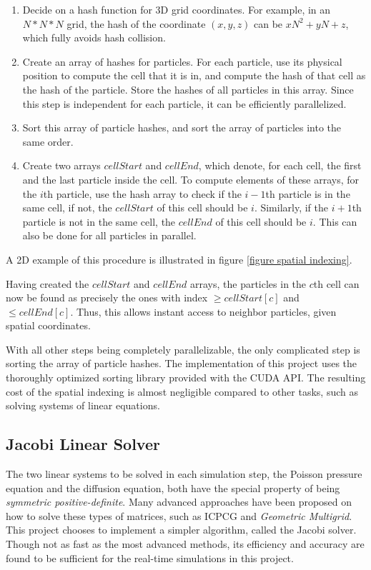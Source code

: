 \begin{enumerate}
    \item Decide on a hash function for 3D grid coordinates. For example, in an $N*N*N$ grid, the hash of the coordinate $(x,y,z)$ can be $xN^2+yN+z$, which fully avoids hash collision.
    
    \item Create an array of hashes for particles. For each particle, use its physical position to compute the cell that it is in, and compute the hash of that cell as the hash of the particle. Store the hashes of all particles in this array. Since this step is independent for each particle, it can be efficiently parallelized.
    
    \item Sort this array of particle hashes, and sort the array of particles into the same order. 
    
    \item Create two arrays $cellStart$ and $cellEnd$, which denote, for each cell, the first and the last particle inside the cell. To compute elements of these arrays, for the $i$th particle, use the hash array to check if the $i-1$th particle is in the same cell, if not, the $cellStart$ of this cell should be $i$. Similarly, if the $i+1$th particle is not in the same cell, the $cellEnd$ of this cell should be $i$. This can also be done for all particles in parallel.
    
\end{enumerate}
A 2D example of this procedure is illustrated in figure \ref{figure spatial indexing}. 

Having created the $cellStart$ and $cellEnd$ arrays, the particles in the $c$th cell can now be found as precisely the ones with index $\geq cellStart[c]$ and $\leq cellEnd[c]$. Thus, this allows instant access to neighbor particles, given spatial coordinates.

With all other steps being completely parallelizable, the only complicated step is sorting the array of particle hashes. The implementation of this project uses the thoroughly optimized sorting library provided with the CUDA API. The resulting cost of the spatial indexing is almost negligible compared to other tasks, such as solving systems of linear equations.



\subsection{Jacobi Linear Solver}
The two linear systems to be solved in each simulation step, the Poisson pressure equation and the diffusion equation, both have the special property of being \textit{symmetric positive-definite}. Many advanced approaches have been proposed on how to solve these types of matrices, such as ICPCG \cite{bridson2015fluid} and \textit{Geometric Multigrid}\cite{chentanez2011real}. This project chooses to implement a simpler algorithm, called the Jacobi solver. Though not as fast as the most advanced methods, its efficiency and accuracy are found to be sufficient for the real-time simulations in this project.

